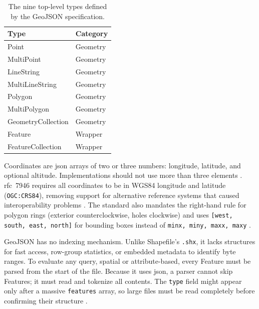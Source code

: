 \begin{table}[H]
    \centering
    \begin{tabular}{ll}
        \toprule
        \textbf{Type} & \textbf{Category} \\
        \midrule
        Point               & Geometry \\
        MultiPoint          & Geometry \\
        LineString          & Geometry \\
        MultiLineString     & Geometry \\
        Polygon             & Geometry \\
        MultiPolygon        & Geometry \\
        GeometryCollection  & Geometry \\
        Feature             & Wrapper  \\
        FeatureCollection   & Wrapper  \\
        \bottomrule
    \end{tabular}
    \caption[GeoJSON top-level types.]{The nine top-level types defined by the GeoJSON specification.}
    \label{tab:geojson-types}
\end{table}

Coordinates are \acrshort{json} arrays of two or three numbers: longitude, latitude, and optional altitude. Implementations should not use more than three elements \parencite{butler2016_rfc7946_geojson_format}. \acrshort{rfc}~7946 requires all coordinates to be in WGS84 longitude and latitude (\texttt{OGC:CRS84}), removing support for alternative reference systems that caused interoperability problems \parencite{butler2016_rfc7946_geojson_format}. The standard also mandates the right-hand rule for polygon rings (exterior counterclockwise, holes clockwise) and uses \texttt{[west, south, east, north]} for bounding boxes instead of \texttt{minx, miny, maxx, maxy} \parencite{butler2016_rfc7946_geojson_format}.

GeoJSON has no indexing mechanism. Unlike Shapefile's \texttt{.shx}, it lacks structures for fast access, row-group statistics, or embedded metadata to identify byte ranges. To evaluate any query, spatial or attribute-based, every Feature must be parsed from the start of the file. Because it uses \acrshort{json}, a parser cannot skip Features; it must read and tokenize all contents. The \texttt{type} field might appear only after a massive \texttt{features} array, so large files must be read completely before confirming their structure \parencite{butler2016_rfc7946_geojson_format}.


